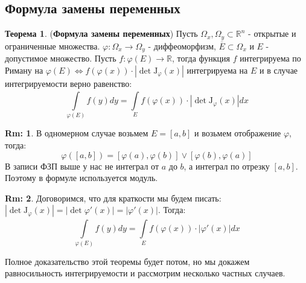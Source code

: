 \documentclass[12pt]{article}
\newcommand{\MR}{\mathbb{R}}
\newcommand{\MJ}{\mathrm{J}}
\theoremstyle{definition}
\newtheorem{rem}{Rm:}
\newtheorem{theorem}{Теорема}
\newcommand{\ddint}[2]{\displaystyle\int\limits_{#1}^{#2}}
\newcommand{\ovl}[1]{\overline{#1}}
\begin{document}
\subsection*{Формула замены переменных}
\begin{theorem}(\textbf{Формула замены переменных})
	Пусть $\Omega_x, \Omega_y \subset \MR^n$ - открытые и ограниченные множества. $\varphi \colon \Omega_x \to \Omega_y$ - диффеоморфизм, $\ovl{E}\subset \Omega_x$ и $E$ - допустимое множество. Пусть $f \colon \varphi(E) \to \MR$, тогда функция $f$ интегрируема по Риману на $\varphi(E) \Leftrightarrow f(\varphi(x)){\cdot}|\det{\MJ_\varphi(x)}|$ интегрируема на $E$ и в случае интегрируемости верно равенство:
	$$
		\ddint{\varphi(E)}{}f(y)dy = \ddint{E}{}f(\varphi(x)){\cdot}|\det{\MJ_\varphi(x)}|dx
	$$
\end{theorem}
\begin{rem}
	В одномерном случае возьмем $E = [a,b]$ и возьмем отображение $\varphi$, тогда: 
	$$
		\varphi([a,b]) = [\varphi(a),\varphi(b)] \vee [\varphi(b), \varphi(a)]
	$$
	В записи ФЗП выше у нас не интеграл от $a$ до $b$, а интеграл по отрезку $[a,b]$. Поэтому в формуле используется модуль.
\end{rem}
\begin{rem}
	Договоримся, что для краткости мы будем писать: $|\det{\MJ_\varphi}(x)| = |\det \varphi'(x)| = |\varphi'(x)|$. Тогда:
	$$
		\ddint{\varphi(E)}{}f(y)dy = \ddint{E}{}f(\varphi(x)){\cdot}|\varphi'(x)|dx
	$$
\end{rem}
Полное доказательство этой теоремы будет потом, но мы докажем равносильность интегрируемости и рассмотрим несколько частных случаев.
\end{document}
